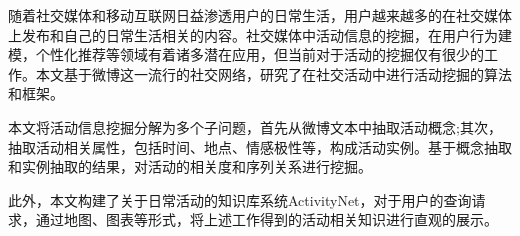
 

\makeatletter
\ifthu@bachelor\relax\else
  \ifthu@doctor
  \else
    \ifthu@master
    \fi
  \fi
\fi
\makeatother






\begin{cabstract}
随着社交媒体和移动互联网日益渗透用户的日常生活，用户越来越多的在社交媒体上发布和自己的日常生活相关的内容。社交媒体中活动信息的挖掘，在用户行为建模，个性化推荐等领域有着诸多潜在应用，但当前对于活动的挖掘仅有很少的工作。本文基于微博这一流行的社交网络，研究了在社交活动中进行活动挖掘的算法和框架。

本文将活动信息挖掘分解为多个子问题，首先从微博文本中抽取活动概念;其次，抽取活动相关属性，包括时间、地点、情感极性等，构成活动实例。基于概念抽取和实例抽取的结果，对活动的相关度和序列关系进行挖掘。

此外，本文构建了关于日常活动的知识库系统ActivityNet，对于用户的查询请求，通过地图、图表等形式，将上述工作得到的活动相关知识进行直观的展示。
\end{cabstract}

